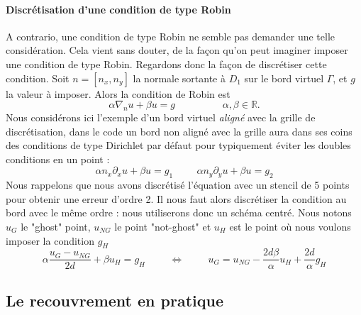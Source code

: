\documentclass[a4paper,11pt]{article}
\begin{document}
\paragraph{Discrétisation d'une condition de type Robin}
A contrario, une condition de type Robin ne semble pas demander une telle considération. Cela vient sans douter, de la façon qu'on peut imaginer imposer une condition de type Robin. Regardons donc la façon de discrétiser cette condition.
Soit $n = \left[n_x, n_y\right]$ la normale sortante à $D_1$ sur le bord virtuel $\Gamma$, et $g$ la valeur à imposer. Alors la condition de Robin est
\begin{equation}
	\alpha\nabla_n u + \beta u = g \hspace{2cm} \alpha, \beta \in \mathbb{R}.
\end{equation}
Nous considérons ici l'exemple d'un bord virtuel \textit{aligné} avec la grille de discrétisation, dans le code un bord non aligné avec la grille aura dans ses coins des conditions de type Dirichlet par défaut pour typiquement éviter les doubles conditions en un point :
\begin{equation*}
	\alpha n_x \partial_x u + \beta u = g_1 \hspace{1cm} \alpha n_y \partial_y u + \beta u = g_2
\end{equation*}
Nous rappelons que nous avons discrétisé l'équation avec un stencil de 5 points pour obtenir une erreur d'ordre 2. Il nous faut alors discrétiser la condition au bord avec le même ordre : nous utiliserons donc un schéma centré. Nous notons $u_{G}$ le "ghost" point, $u_{NG}$ le point "not-ghost" et $u_H$ est le point où nous voulons imposer la condition $g_H$
\begin{equation*}
	\alpha\frac{u_{G} - u_{NG}}{2d} + \beta u_H = g_H \hspace{1cm}\Longleftrightarrow \hspace{1cm} u_G = u_{NG}-\frac{2d\beta}{\alpha}u_H + \frac{2d}{\alpha}g_H
\end{equation*}

\subsection{Le recouvrement en pratique}
\end{document}
